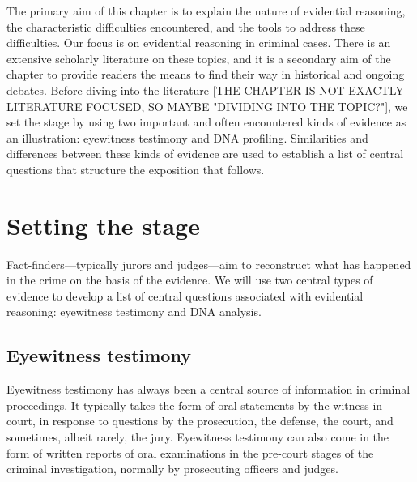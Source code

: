 \documentclass[10pt]{article}
\begin{document}
The primary aim of this chapter is to explain the nature of evidential reasoning, the characteristic difficulties encountered, and the tools to address these difficulties. Our focus is on evidential reasoning in criminal cases. There is an extensive scholarly literature on these topics, and it is a secondary aim of the chapter to provide readers the means to find their way in historical and ongoing debates. Before diving into the literature [THE CHAPTER IS NOT EXACTLY LITERATURE FOCUSED, SO MAYBE "DIVIDING INTO THE TOPIC?"], we set the stage by using two important and often encountered kinds of evidence as an illustration: eyewitness testimony and DNA profiling. Similarities and differences between these kinds of evidence are used to establish a list of central questions that structure the exposition that follows.


\section{Setting the stage}


Fact-finders---typically jurors and judges---aim to reconstruct what has happened in the crime on the basis of the evidence. 
We will use two central types of evidence to develop a list of central questions associated with evidential reasoning: eyewitness testimony and DNA analysis.

\subsection{Eyewitness testimony}

Eyewitness testimony has always been a central source of information in criminal proceedings. It typically takes the form of oral statements by the witness in court, in response to questions by the prosecution, the defense, the court, and sometimes, albeit rarely, the jury. Eyewitness testimony can also come 
in the form of written reports of oral examinations in the pre-court stages of the criminal investigation, normally by prosecuting officers and judges. 
\end{document}
